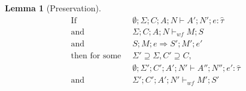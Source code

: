 \documentclass[showabstract,showacknowledgments,showpreface,showdedication,school]{iuphd}
\newtheorem{lemma}[theorem]{Lemma}
\theoremstyle{nonumberplain}
\newcommand{\keywd}[1]{\mathit{#1}}
\newcommand{\EXPR}{\keywd{e}}
\newcommand{\hTYP}{\keywd{\hat{\tau}}}
\newcommand{\STOR}{\keywd{S}}
\newcommand{\stepsto}{\Rightarrow}
\newcommand{\CENV}{\keywd{C}}
\newcommand{\SENV}{\keywd{\Sigma}}
\newcommand{\MENV}{\keywd{M}}
\newcommand{\AENV}{\keywd{A}}
\newcommand{\NENV}{\keywd{N}}
\newcommand{\storewf}[6]{\ensuremath{#1;#2;#3;#4 \vdash_{wf} #5;#6}}
\newcommand{\emptytenv}{\emptyset}
\begin{document}
\begin{lemma}[Preservation]
  \label{lemma:preservation_brief}
  \begin{displaymath}
    \begin{aligned}
      \text{If} \;\; & \emptytenv;\SENV;\CENV;\AENV;\NENV \vdash \AENV';\NENV';\EXPR : \hTYP \\
      \text{and} \;\; & \storewf{\SENV}{\CENV}{\AENV}{\NENV}{\MENV}{\STOR}\\
      \text{and} \;\; & \STOR;\MENV;\EXPR \stepsto \STOR';\MENV';\EXPR' \\
      \text{then for some} \;\; & \SENV' \supseteq \SENV, \CENV' \supseteq \CENV ,\\
      & \emptytenv;\SENV';\CENV';\AENV';\NENV' \vdash \AENV'';\NENV'';\EXPR' : \hTYP \\
      \text{and} \;\; & \storewf{\SENV'}{\CENV'}{\AENV'}{\NENV'}{\MENV'}{\STOR'}\\
    \end{aligned}
  \end{displaymath}
\end{lemma}
\end{document}

